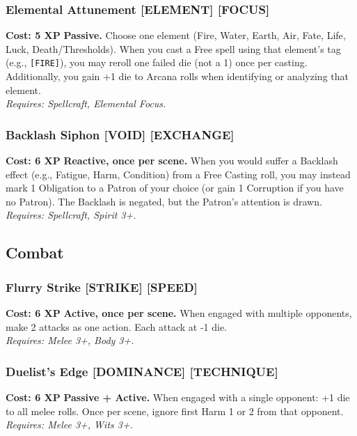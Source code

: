 \documentclass[12pt,a4paper]{book}
\begin{document}
\subsubsection*{Elemental Attunement \textnormal{[ELEMENT] [FOCUS]}}
\label{talent:elemental-attunement}
\textbf{Cost: 5 XP} \textbf{Passive.} Choose one element (Fire, Water, Earth, Air, Fate, Life, Luck, Death/Thresholds). When you cast a Free spell using that element's tag (e.g., \texttt{[FIRE]}), you may reroll one failed die (not a 1) once per casting. Additionally, you gain +1 die to Arcana rolls when identifying or analyzing that element. \\
\textit{Requires: Spellcraft, Elemental Focus.}

\subsubsection*{Backlash Siphon \textnormal{[VOID] [EXCHANGE]}}
\label{talent:backlash-siphon}
\textbf{Cost: 6 XP} \textbf{Reactive, once per scene.} When you would suffer a Backlash effect (e.g., Fatigue, Harm, Condition) from a Free Casting roll, you may instead mark 1 Obligation to a Patron of your choice (or gain 1 Corruption if you have no Patron). The Backlash is negated, but the Patron's attention is drawn. \\
\textit{Requires: Spellcraft, Spirit 3+.}

\subsection*{Combat}
\label{sec:major-combat}

\subsubsection*{Flurry Strike \textnormal{[STRIKE] [SPEED]}}
\label{talent:flurry-strike}
\textbf{Cost: 6 XP} \textbf{Active, once per scene.} When engaged with multiple opponents, make 2 attacks as one action. Each attack at -1 die. \\
\textit{Requires: Melee 3+, Body 3+.}

\subsubsection*{Duelist's Edge \textnormal{[DOMINANCE] [TECHNIQUE]}}
\label{talent:duelists-edge}
\textbf{Cost: 6 XP} \textbf{Passive + Active.} When engaged with a single opponent: +1 die to all melee rolls. Once per scene, ignore first Harm 1 or 2 from that opponent. \\
\textit{Requires: Melee 3+, Wits 3+.}
\end{document}
